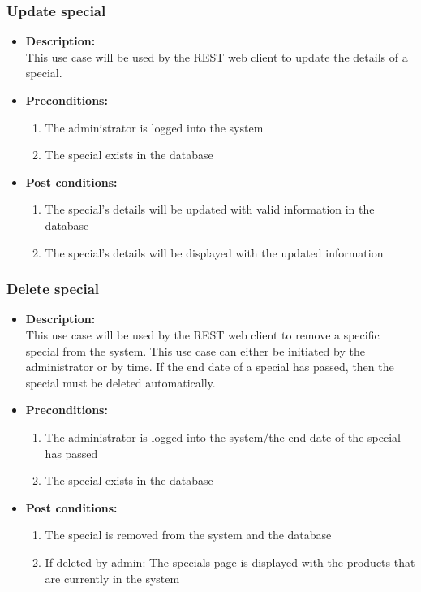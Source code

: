 \documentclass[a4paper,10pt]{article}
\begin{document}
\subsubsection{Update special}
\begin{itemize}
	\item \textbf {Description:}\\
	This use case will be used by the REST web client to update the details of a special.
	\item \textbf {Preconditions:}
		\begin{enumerate}
			\item The administrator is logged into the system
			\item The special exists in the database
		\end{enumerate}
	\item \textbf {Post conditions:}
		\begin{enumerate}
			\item The special’s details will be updated with valid information in the database
			\item The special’s details will be displayed with the updated information
		\end{enumerate}
\end{itemize}
\subsubsection{Delete special}
\begin{itemize}
	\item \textbf {Description:}\\
	This use case will be used by the REST web client to remove a specific special from the system. This use case can either be initiated by the 				administrator or by time. If the end date of a special has passed, then the special must be deleted automatically.
	\item \textbf {Preconditions:}
		\begin{enumerate}
			\item The administrator is logged into the system/the end date of the special has passed
			\item The special exists in the database
		\end{enumerate}
	\item \textbf {Post conditions:}
		\begin{enumerate}
			\item The special is removed from the system and the database
			\item If deleted by admin: The specials page is displayed with the products that are currently in the system
		\end{enumerate}
\end{itemize}
\end{document}
